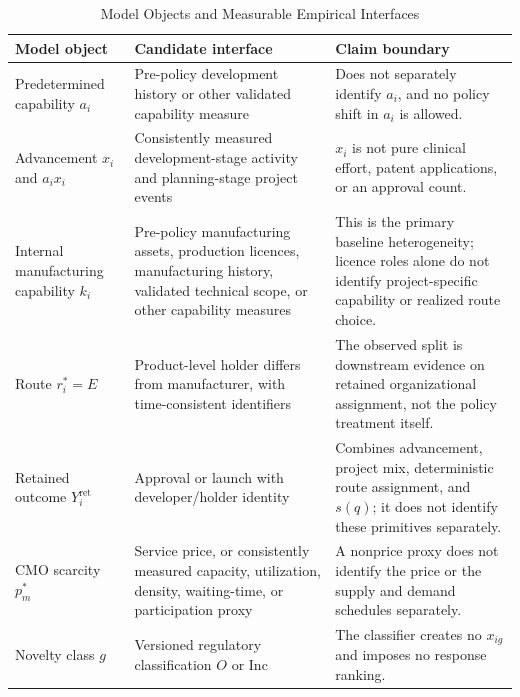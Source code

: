 \documentclass[12pt]{article}
\newcommand{\1}{\mathbf{1}}
\begin{document}
\begin{table}[htbp]
\centering
\footnotesize
\caption{Model Objects and Measurable Empirical Interfaces}
\label{tab:model_data_mapping}
\begin{tabularx}{\textwidth}{L{0.24\textwidth}Y Y}
\toprule
Model object & Candidate interface & Claim boundary \\
\midrule
Predetermined capability \(a_i\) & Pre-policy development history or other validated capability measure & Does not separately identify \(a_i\), and no policy shift in \(a_i\) is allowed. \\
Advancement \(x_i\) and \(a_ix_i\) & Consistently measured development-stage activity and planning-stage project events & \(x_i\) is not pure clinical effort, patent applications, or an approval count. \\
Internal manufacturing capability \(k_i\) & Pre-policy manufacturing assets, production licences, manufacturing history, validated technical scope, or other capability measures & This is the primary baseline heterogeneity; licence roles alone do not identify project-specific capability or realized route choice. \\
Route \(r_i^*=E\) & Product-level holder differs from manufacturer, with time-consistent identifiers & The observed split is downstream evidence on retained organizational assignment, not the policy treatment itself. \\
Retained outcome \(Y_i^{\mathrm{ret}}\) & Approval or launch with developer/holder identity & Combines advancement, project mix, deterministic route assignment, and \(s(q)\); it does not identify these primitives separately. \\
CMO scarcity \(p_m^*\) & Service price, or consistently measured capacity, utilization, density, waiting-time, or participation proxy & A nonprice proxy does not identify the price or the supply and demand schedules separately. \\
Novelty class \(g\) & Versioned regulatory classification \(O\) or \(\mathrm{Inc}\) & The classifier creates no \(x_{ig}\) and imposes no response ranking. \\
\bottomrule
\end{tabularx}
\end{table}
\end{document}

